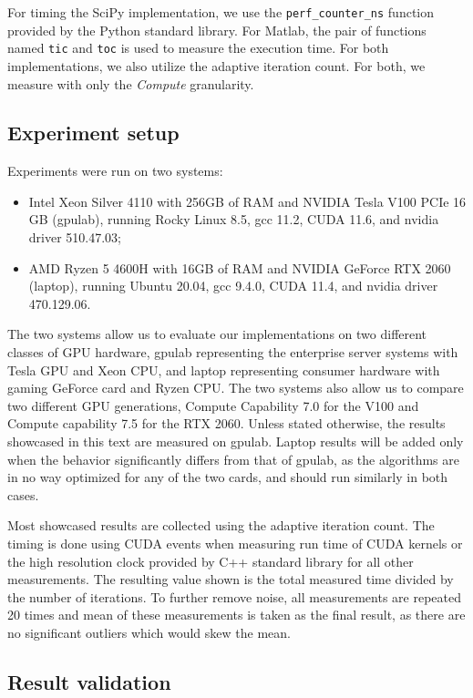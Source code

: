 For timing the SciPy implementation, we use the \texttt{perf\_counter\_ns} function provided by the Python standard library. For Matlab, the pair of functions named \texttt{tic} and \texttt{toc} is used to measure the execution time. For both implementations, we also utilize the adaptive iteration count. For both, we measure with only the \textit{Compute} granularity.


\subsection{Experiment setup}

Experiments were run on two systems:
\begin{itemize}
	\item Intel Xeon Silver 4110 with 256GB of RAM and NVIDIA Tesla V100 PCIe 16 GB (gpulab), running Rocky Linux 8.5, gcc 11.2, CUDA 11.6, and nvidia driver 510.47.03;
	\item AMD Ryzen 5 4600H with 16GB of RAM and NVIDIA GeForce RTX 2060 (laptop), running Ubuntu 20.04, gcc 9.4.0, CUDA 11.4, and nvidia driver 470.129.06.
\end{itemize}

The two systems allow us to evaluate our implementations on two different classes of GPU hardware, gpulab representing the enterprise server systems with Tesla GPU and Xeon CPU, and laptop representing consumer hardware with gaming GeForce card and Ryzen CPU. The two systems also allow us to compare two different GPU generations, Compute Capability 7.0 for the V100 and Compute capability 7.5 for the RTX 2060. Unless stated otherwise, the results showcased in this text are measured on gpulab. Laptop results will be added only when the behavior significantly differs from that of gpulab, as the algorithms are in no way optimized for any of the two cards, and should run similarly in both cases. 

Most showcased results are collected using the adaptive iteration count. The timing is done using CUDA events when measuring run time of CUDA kernels or the high resolution clock provided by C++ standard library for all other measurements.  The resulting value shown is the total measured time divided by the number of iterations. To further remove noise, all measurements are repeated 20 times and mean of these measurements is taken as the final result, as there are no significant outliers which would skew the mean.



\subsection{Result validation}


